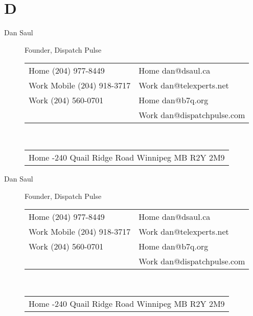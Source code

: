 \documentclass{article}
\newcommand\mydotfill{\cftdotfill{\cftdotsep}}
\begin{document}
	\section*{D}
	\begin{description}
		\item [Dan Saul] \small Founder, Dispatch Pulse \\ 
		
		\begin{tabular}{ l || l }
			Home \enspace\mydotfill\enspace (204) 977-8449 & Home \enspace\mydotfill\enspace dan@dsaul.ca \\ 
			Work Mobile \enspace\mydotfill\enspace (204) 918-3717 & Work \enspace\mydotfill\enspace dan@telexperts.net \\  
			Work \enspace\mydotfill\enspace (204) 560-0701 & Home \enspace\mydotfill\enspace dan@b7q.org \\
			 \enspace\mydotfill\enspace  & Work \enspace\mydotfill\enspace dan@dispatchpulse.com \\\hline 
		\end{tabular}\\
		\begin{tabular}{ l }
		 Home \enspace\mydotfill\enspace 312-240 Quail Ridge Road Winnipeg MB R2Y 2M9 \\
		\end{tabular} \vspace{2ex}
		
	    \normalsize	\blindtext
	    \filbreak
		\item [Dan Saul] \small Founder, Dispatch Pulse \\ 
		
		\begin{tabular}{ l || l }
			Home \enspace\mydotfill\enspace (204) 977-8449 & Home \enspace\mydotfill\enspace dan@dsaul.ca \\ 
			Work Mobile \enspace\mydotfill\enspace (204) 918-3717 & Work \enspace\mydotfill\enspace dan@telexperts.net \\  
			Work \enspace\mydotfill\enspace (204) 560-0701 & Home \enspace\mydotfill\enspace dan@b7q.org \\
			\enspace\mydotfill\enspace  & Work \enspace\mydotfill\enspace dan@dispatchpulse.com \\\hline 
		\end{tabular}\\
		\begin{tabular}{ l }
			Home \enspace\mydotfill\enspace 312-240 Quail Ridge Road Winnipeg MB R2Y 2M9 \\
		\end{tabular} \vspace{2ex}
		

\end{description}
\end{document}
